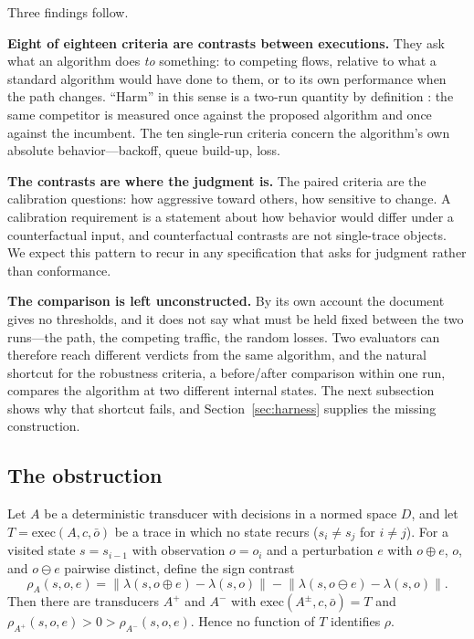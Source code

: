 \documentclass[sigconf,review,anonymous]{acmart}
\newcommand{\exec}{\mathrm{exec}}
\begin{document}
	Three findings follow.
	
	\textbf{Eight of eighteen criteria are contrasts between executions.}
	They ask what an algorithm does \emph{to} something: to competing flows,
	relative to what a standard algorithm would have done to them, or to its
	own performance when the path changes. ``Harm'' in this sense is a
	two-run quantity by definition \cite{ware2019}: the same competitor is
	measured once against the proposed algorithm and once against the
	incumbent. The ten single-run criteria concern the algorithm's own
	absolute behavior---backoff, queue build-up, loss.
	
	\textbf{The contrasts are where the judgment is.} The paired criteria
	are the calibration questions: how aggressive toward others, how
	sensitive to change. A calibration requirement is a statement about how
	behavior would differ under a counterfactual input, and counterfactual
	contrasts are not single-trace objects. We expect this pattern to recur
	in any specification that asks for judgment rather than conformance.
	
	\textbf{The comparison is left unconstructed.} By its own account the
	document gives no thresholds, and it does not say what must be held
	fixed between the two runs---the path, the competing traffic, the random
	losses. Two evaluators can therefore reach different verdicts from the
	same algorithm, and the natural shortcut for the robustness criteria, a
	before/after comparison within one run, compares the algorithm at two
	different internal states. The next subsection shows why that shortcut
	fails, and Section~\ref{sec:harness} supplies the missing construction.
	
	\subsection{The obstruction}
	
	\begin{proposition}
		\label{prop:confound}
		Let $A$ be a deterministic transducer with decisions in a normed space
		$D$, and let $T = \exec(A, c, \bar{o})$ be a trace in which no state
		recurs ($s_i \neq s_j$ for $i \neq j$). For a visited state $s = s_{i-1}$
		with observation $o = o_i$ and a perturbation $e$ with
		$o \oplus e$, $o$, and $o \ominus e$ pairwise distinct, define the sign contrast
		\[
		\rho_A(s, o, e) = \big\| \lambda(s, o \oplus e) - \lambda(s, o) \big\|
		- \big\| \lambda(s, o \ominus e) - \lambda(s, o) \big\| .
		\]
		Then there are transducers $A^{+}$ and $A^{-}$ with
		$\exec(A^{\pm}, c, \bar{o}) = T$ and
		$\rho_{A^{+}}(s,o,e) > 0 > \rho_{A^{-}}(s,o,e)$. Hence no function of $T$
		identifies $\rho$.
	\end{proposition}
	
\end{document}
